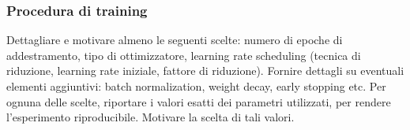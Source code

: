 \subsubsection{Procedura di training}
Dettagliare e motivare almeno le seguenti scelte: numero di epoche di addestramento, tipo di ottimizzatore, learning rate scheduling (tecnica di riduzione, learning rate iniziale, fattore di riduzione). Fornire dettagli su eventuali elementi aggiuntivi: batch normalization, weight decay, early stopping etc. Per ognuna delle scelte, riportare i valori esatti dei parametri utilizzati, per rendere l’esperimento riproducibile. Motivare la scelta di tali valori.